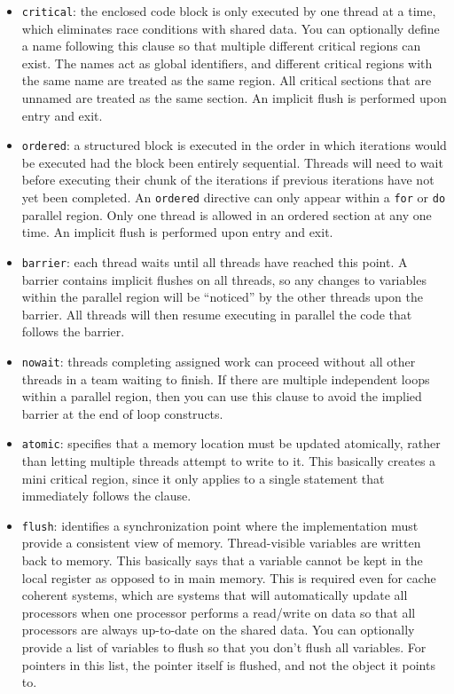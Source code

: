 \documentclass[10pt]{article}
\begin{document}
\begin{flushleft}
\begin{itemize}
\item {\tt critical}: the enclosed code block is only executed by one thread at a time, which eliminates race conditions with shared data. You can optionally define a name following this clause so that multiple different critical regions can exist. The names act as global identifiers, and different critical regions with the same name are treated as the same region. All critical sections that are unnamed are treated as the same section. An implicit flush is performed upon entry and exit.
\item {\tt ordered}: a structured block is executed in the order in which iterations would be executed had the block been entirely sequential. Threads will need to wait before executing their chunk of the iterations if previous iterations have not yet been completed. An {\tt ordered} directive can only appear within a {\tt for} or {\tt do} parallel region. Only one thread is allowed in an ordered section at any one time. An implicit flush is performed upon entry and exit.
\item {\tt barrier}: each thread waits until all threads have reached this point. A barrier contains implicit flushes on all threads, so any changes to variables within the parallel region will be ``noticed'' by the other threads upon the barrier. All threads will then resume executing in parallel the code that follows the barrier.
\item {\tt nowait}: threads completing assigned work can proceed without all other threads in a team waiting to finish. If there are multiple independent loops within a parallel region, then you can use this clause to avoid the implied barrier at the end of loop constructs.
\item {\tt atomic}: specifies that a memory location must be updated atomically, rather than letting multiple threads attempt to write to it. This basically creates a mini critical region, since it only applies to a single statement that immediately follows the clause.
\item {\tt flush}: identifies a synchronization point where the implementation must provide a consistent view of memory. Thread-visible variables are written back to memory. This basically says that a variable cannot be kept in the local register as opposed to in main memory. This is required even for cache coherent systems, which are systems that will automatically update all processors when one processor performs a read/write on data so that all processors are always up-to-date on the shared data. You can optionally provide a list of variables to flush so that you don't flush all variables. For pointers in this list, the pointer itself is flushed, and not the object it points to. 
\end{itemize}


\end{flushleft}
\end{document}
